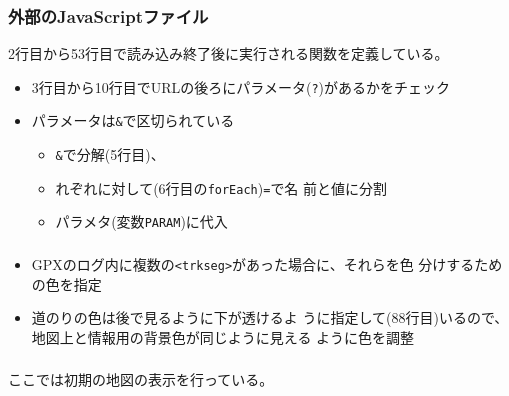 \begin{frame}[containsverbatim]
 \frametitle{外部のJavaScriptファイル}
 2行目から53行目で読み込み終了後に実行される関数を定義している。
 \begin{itemize}
	\item 3行目から10行目でURLの後ろにパラメータ(\Verb+?+)があるかをチェック
	\item パラメータは\Verb+&+で区切られている
        \begin{itemize}
         \item \Verb+&+で分解(5行目)、
         \item れぞれに対して(6行目の\Verb+forEach+)\Verb+=+で名
				前と値に分割
         \item パラメタ(変数\Verb+PARAM+)に代入
        \end{itemize}
 \end{itemize}
\end{frame}
\begin{frame}[containsverbatim]
 \frametitle{}
 \begin{itemize}
  \item GPXのログ内に複数の\Verb+<trkseg>+があった場合に、それらを色
 分けするための色を指定
  \item 道のりの色は後で見るように下が透けるよ
 うに指定して(88行目)いるので、地図上と情報用の背景色が同じように見える
 ように色を調整
 \end{itemize}
\end{frame}
\begin{frame}[containsverbatim]
 \frametitle{}
  ここでは初期の地図の表示を行っている。
\end{frame}
\begin{frame}[containsverbatim]
 \frametitle{}
\end{frame}
